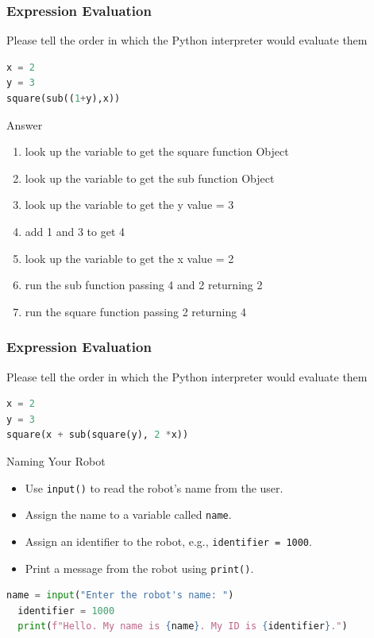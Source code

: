 \begin{frame}[fragile]
\frametitle{Expression Evaluation}
Please tell the order in which the Python interpreter would evaluate them
 \begin{lstlisting}[language=Python]
x = 2
y = 3
square(sub((1+y),x)) 
\end{lstlisting}
\end{frame} 

\begin{frame}{Answer}
\begin{enumerate}
    \item look up the variable to get the square function Object
    \item look up the variable to get the sub function Object
    \item look up the variable to get the y value = 3
    \item add 1 and 3 to get 4
    \item look up the variable to get the x value = 2
    \item run the sub function passing 4 and 2 returning 2
    \item run the square function passing 2 returning 4
\end{enumerate}
\end{frame}

\begin{frame}[fragile]
\frametitle{Expression Evaluation}
Please tell the order in which the Python interpreter would evaluate them
 \begin{lstlisting}[language=Python]
x = 2
y = 3
square(x + sub(square(y), 2 *x))
\end{lstlisting}
\end{frame} 

\begin{frame}[fragile]{Naming Your Robot}
    \begin{itemize}
        \item Use \texttt{input()} to read the robot's name from the user.
        \item Assign the name to a variable called \texttt{name}.
        \item Assign an identifier to the robot, e.g., \texttt{identifier = 1000}.
        \item Print a message from the robot using \texttt{print()}.
    \end{itemize}
    \begin{lstlisting}[language=Python]
  name = input("Enter the robot's name: ")
  identifier = 1000
  print(f"Hello. My name is {name}. My ID is {identifier}.")
    \end{lstlisting}
\end{frame}

